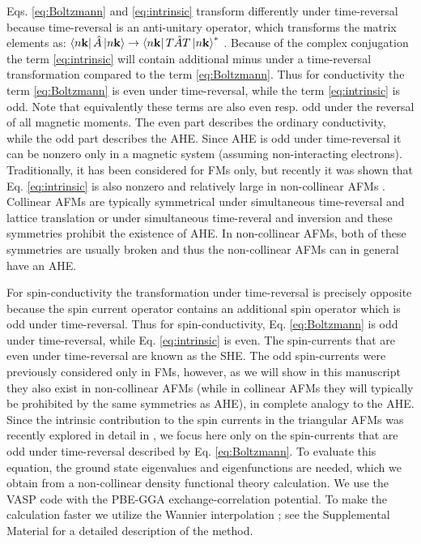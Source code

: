 \documentclass[aps,prl,reprint,amsmath,amssymb,superscriptaddress]{revtex4-1}
\newcommand{\kb}{\mathbf{k}}
\begin{document}
Eqs. \eqref{eq:Boltzmann} and \eqref{eq:intrinsic} transform differently under time-reversal because time-reversal is an anti-unitary operator, which transforms the matrix elements as: $\Bra{n\kb}\hat{A}\Ket{n\kb} \rightarrow \Bra{n\kb}T\hat{A}T\Ket{n\kb}^*$ \cite{Zelezny2017}. Because of the complex conjugation the term \eqref{eq:intrinsic} will contain additional minus under a time-reversal transformation compared to the term \eqref{eq:Boltzmann}. Thus for conductivity the term \eqref{eq:Boltzmann} is even under time-reversal, while the term \eqref{eq:intrinsic} is odd. Note that equivalently these terms are also even resp. odd under the reversal of all magnetic moments. The even part describes the ordinary conductivity, while the odd part describes the AHE. Since AHE is odd under time-reversal it can be nonzero only in a magnetic system (assuming non-interacting electrons). Traditionally, it has been considered for FMs only, but recently it was shown that Eq. \eqref{eq:intrinsic} is also nonzero and relatively large in non-collinear AFMs \cite{Kubler2014,Chen2014}. Collinear AFMs are typically symmetrical under simultaneous time-reversal and lattice translation or under simultaneous time-reveral and inversion and these symmetries prohibit the existence of AHE. In non-collinear AFMs, both of these symmetries are usually broken and thus the non-collinear AFMs can in general have an AHE. 

For spin-conductivity the transformation under time-reversal is precisely opposite because the spin current operator contains an additional spin operator which is odd under time-reversal. Thus for spin-conductivity, Eq. \eqref{eq:Boltzmann} is odd under time-reversal, while Eq. \eqref{eq:intrinsic} is even. The spin-currents that are even under time-reversal are known as the SHE. The odd spin-currents were previously considered only in FMs, however, as we will show in this manuscript they also exist in non-collinear AFMs (while in collinear AFMs they will typically be prohibited by the same symmetries as AHE), in complete analogy to the AHE. Since the intrinsic contribution to the spin currents in the triangular AFMs was recently explored in detail in \cite{YangZhang2017}, we focus here only on the spin-currents that are odd under time-reversal described by Eq. \eqref{eq:Boltzmann}. To evaluate this equation, the ground state eigenvalues and eigenfunctions are needed, which we obtain from a non-collinear density functional theory calculation. We use the VASP code with the PBE-GGA exchange-correlation potential. To make the calculation faster we utilize the Wannier interpolation \cite{freimuth2014,YangZhang2017}; see the Supplemental Material \cite{SMprl} for a detailed description of the method.
\end{document}
